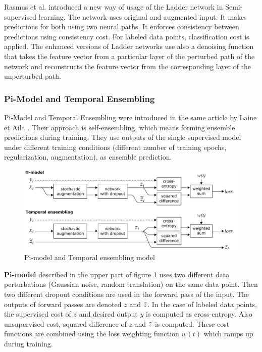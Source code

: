 Rasmus et al. \cite{Rasmus2015} introduced a new way of usage of the Ladder network in Semi-supervised learning. The network uses original and augmented input. It makes predictions for both using two neural paths. It enforces consistency between predictions using consistency cost. For labeled data points, classification cost is applied. The enhanced versions of Ladder networks use also a denoising function that takes the feature vector from a particular layer of the perturbed
path of the network and reconstructs the feature vector from the corresponding layer of the unperturbed path. \cite{tuna}

\subsubsection{Pi-Model and Temporal Ensembling}
Pi-Model and Temporal Ensembling were introduced in the same article by Laine et Aila \cite{laine2017}. Their approach is self-ensembling, which means forming ensemble predictions during training. They use outputs of the single supervised model under different training conditions (different number of training epochs, regularization, augmentation), as ensemble prediction.

\begin{figure}[h!]
    \centering
    \includegraphics[width = 1\textwidth]{figs/pi-tempens.pdf}
    \caption{Pi-model and Temporal ensembling model \cite{laine2017}}
    \label{fig:pi-tempens}
\end{figure}

\textbf{Pi-model} described in the upper part of figure \ref{fig:pi-tempens} uses two different data perturbations (Gaussian noise, random translation) on the same data point. Then two different dropout conditions are used in the forward pass of the input. The outputs of forward passes are denoted $z$ and $\Tilde{z}$. In the case of labeled data points, the supervised cost of $z$ and desired output $y$ is computed as cross-entropy. Also unsupervised cost, squared difference of $z$ and $\Tilde{z}$ is computed. These cost functions are combined using the loss weighting function $w(t)$ which ramps up during training.

